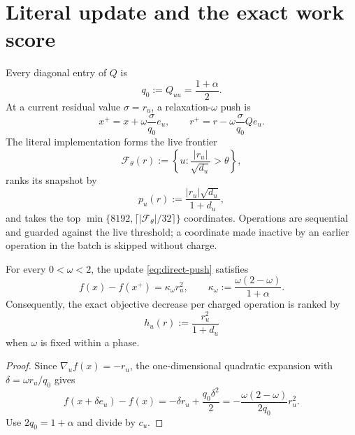 \section{Literal update and the exact work score}
\label{sec:direct-score}

Every diagonal entry of $Q$ is
\begin{equation}
 q_0:=Q_{uu}=\frac{1+\alpha}{2}.
 \label{eq:direct-diagonal}
\end{equation}
At a current residual value $\sigma=r_u$, a relaxation-$\omega$ push is
\begin{equation}
 x^+=x+\omega\frac{\sigma}{q_0}e_u,
 \qquad
 r^+=r-\omega\frac{\sigma}{q_0}Qe_u.
 \label{eq:direct-push}
\end{equation}
The literal implementation forms the live frontier
\begin{equation}
 \mathcal F_\theta(r)
 :=\left\{u:\frac{|r_u|}{\sqrt{d_u}}>\theta\right\},
 \label{eq:direct-frontier}
\end{equation}
ranks its snapshot by
\begin{equation}
 p_u(r):=\frac{|r_u|\sqrt{d_u}}{1+d_u},
 \label{eq:direct-empirical-score}
\end{equation}
and takes the top
$\min\{8192,\lceil|\mathcal F_\theta|/32\rceil\}$ coordinates. Operations
are sequential and guarded against the live threshold; a coordinate made
inactive by an earlier operation in the batch is skipped without charge.

\begin{lemma}
\label{lem:direct-coordinate-decrease}
For every $0<\omega<2$, the update \cref{eq:direct-push} satisfies
\begin{equation}
 f(x)-f(x^+)
 =\kappa_\omega r_u^2,
 \qquad
 \kappa_\omega:=\frac{\omega(2-\omega)}{1+\alpha}.
 \label{eq:direct-coordinate-decrease}
\end{equation}
Consequently, the exact objective decrease per charged operation is ranked by
\begin{equation}
 h_u(r):=\frac{r_u^2}{1+d_u}
 \label{eq:direct-exact-work-score}
\end{equation}
when $\omega$ is fixed within a phase.
\end{lemma}

\begin{proof}
Since $\nabla_u f(x)=-r_u$, the one-dimensional quadratic expansion with
$\delta=\omega r_u/q_0$ gives
\[
 f(x+\delta e_u)-f(x)
 =-\delta r_u+\frac{q_0\delta^2}{2}
 =-\frac{\omega(2-\omega)}{2q_0}r_u^2.
\]
Use $2q_0=1+\alpha$ and divide by $c_u$.
\end{proof}

